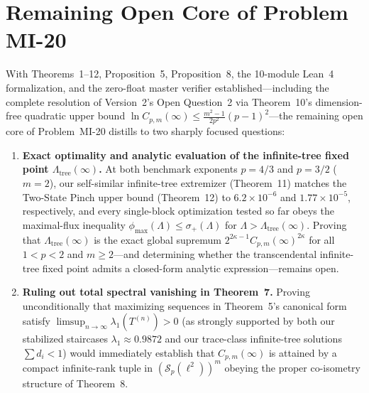 \documentclass[10pt,letterpaper]{article}
\newcommand{\Sp}{\mathcal{S}_p}
\begin{document}
\section{Remaining Open Core of Problem MI-20}

With Theorems~1--12, Proposition~5, Proposition~8, the 10-module Lean~4 formalization, and the zero-float master verifier established—including the complete resolution of Version~2's Open Question~2 via Theorem~10's dimension-free quadratic upper bound $\ln C_{p,m}(\infty) \le \frac{m^2-1}{2p^2}(p-1)^2$—the remaining open core of Problem~MI-20 distills to two sharply focused questions:
\begin{enumerate}[leftmargin=1.6em,itemsep=3pt]
  \item \textbf{Exact optimality and analytic evaluation of the infinite-tree fixed point $\Lambda_{\mathrm{tree}}(\infty)$.} At both benchmark exponents $p = 4/3$ and $p = 3/2$ ($m = 2$), our self-similar infinite-tree extremizer (Theorem~11) matches the Two-State Pinch upper bound (Theorem~12) to $6.2 \times 10^{-6}$ and $1.77 \times 10^{-5}$, respectively, and every single-block optimization tested so far obeys the maximal-flux inequality $\phi_{\max}(\Lambda) \le \sigma_+(\Lambda)$ for $\Lambda > \Lambda_{\mathrm{tree}}(\infty)$. Proving that $\Lambda_{\mathrm{tree}}(\infty)$ is the exact global supremum $2^{2\kappa-1} C_{p,m}(\infty)^{2\kappa}$ for all $1 < p < 2$ and $m \ge 2$—and determining whether the transcendental infinite-tree fixed point admits a closed-form analytic expression—remains open.
  \item \textbf{Ruling out total spectral vanishing in Theorem~7.} Proving unconditionally that maximizing sequences in Theorem~5's canonical form satisfy $\limsup_{n\to\infty}\lambda_1(T^{(n)}) > 0$ (as strongly supported by both our stabilized staircases $\lambda_1 \approx 0.9872$ and our trace-class infinite-tree solutions $\sum d_i < 1$) would immediately establish that $C_{p,m}(\infty)$ is attained by a compact infinite-rank tuple in $(\Sp(\ell^2))^m$ obeying the proper co-isometry structure of Theorem~8.
\end{enumerate}
\end{document}
